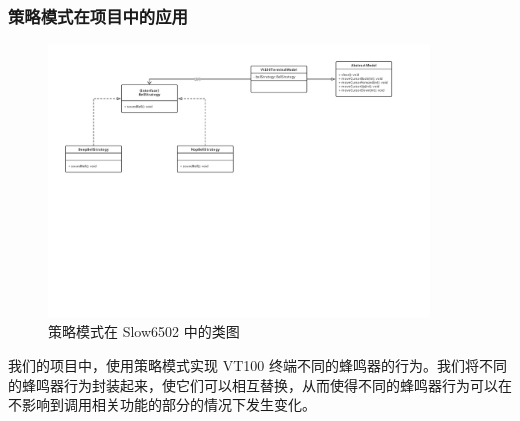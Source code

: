 \subsubsection{策略模式在项目中的应用}

\begin{figure}[H]
    \centering
    \includegraphics[width=0.9\textwidth]{figures/策略模式.pdf}
    \caption{策略模式在 Slow6502 中的类图}
\end{figure}

我们的项目中，使用策略模式实现 VT100 终端不同的蜂鸣器的行为。我们将不同的蜂鸣器行为封装起来，使它们可以相互替换，从而使得不同的蜂鸣器行为可以在不影响到调用相关功能的部分的情况下发生变化。
